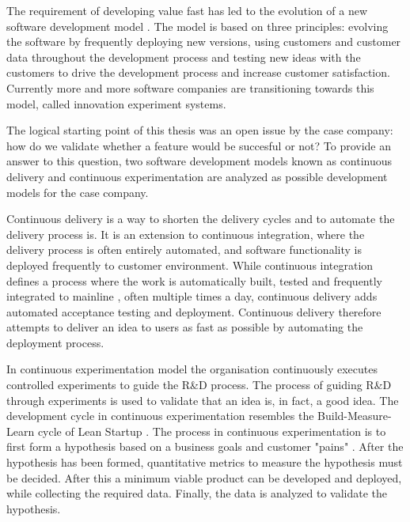 \documentclass[english]{tktltiki2}
\theoremstyle{definition}
\theoremstyle{remark}
\begin{document}
The requirement of developing value fast has led to the evolution of a new software development model \cite{bosch2012building}. The model is based on three principles: evolving the software by frequently deploying new versions, using customers and customer data throughout the development process and testing new ideas with the customers to drive the development process and increase customer satisfaction. Currently more and more software companies are transitioning towards this model, called innovation experiment systems. 

The logical starting point of this thesis was an open issue by the case company: how do we validate whether a feature would be succesful or not? To provide an answer to this question, two software development models known as continuous delivery and continuous experimentation are analyzed as possible development models for the case company. 


Continuous delivery is a way to shorten the delivery cycles and to automate the delivery process is. It is an extension to continuous integration, where the delivery process is often entirely automated, and software functionality is deployed frequently to customer environment. While continuous integration defines a process where the work is automatically built, tested and frequently integrated to mainline \cite{fowler2006continuous}, often multiple times a day, continuous delivery adds automated acceptance testing and deployment. Continuous delivery therefore attempts to deliver an idea to users as fast as possible by automating the deployment process.

In continuous experimentation model the organisation continuously executes controlled experiments to guide the R\&D process. The process of guiding R\&D through experiments is used to validate that an idea is, in fact, a good idea. The development cycle in continuous experimentation resembles the Build-Measure-Learn cycle of Lean Startup \cite{ries2011lean}. The process in continuous experimentation is to first form a hypothesis based on a business goals and customer "pains" \cite{bosch2012building}. After the hypothesis has been formed, quantitative metrics to measure the hypothesis must be decided. After this a minimum viable product can be developed and deployed, while collecting the required data. Finally, the data is analyzed to validate the hypothesis.
\end{document}
